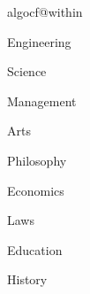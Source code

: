 \renewcommand{\algorithmcfname}{\hei 算法}
\setlength\AlCapSkip{1.2ex}
\SetAlgoSkip{1pt}
\renewcommand{\algocf@captiontext}[2]{\hei \wuhao#1\algocf@typo ~ \AlCapFnt{}#2} %
\expandafter\ifx\csname algocf@within\endcsname\relax%
\renewcommand\thealgocf{\@arabic\c@algocf} %
\else%
\renewcommand\thealgocf{\csname the\algocf@within\endcsname-\@arabic\c@algocf}
\fi
\renewcommand{\algocf@makecaption}[2]{%
  \addtolength{\hsize}{\algomargin}%
  \sbox\@tempboxa{\algocf@captiontext{#1}{#2}}%
    \hskip .5\algomargin%
    \parbox[t]{\hsize}{\centering\algocf@captiontext{#1}{#2}}%
  \addtolength{\hsize}{-\algomargin}%
}
\newcommand{\AlgoBiCaption}[2]{%
   \caption[#1]{\protect\setlength{\baselineskip}{1.5em}#1 \protect \\ Algo. \thealgocf~~ #2} %
   \addcontentsline{aen}{algoen}{\protect\numberline{\thealgoen}{#2}}
   }

\makeatother

\def \xuekeEngineering {Engineering}
\def \xuekeScience {Science}
\def \xuekeManagement {Management}
\def \xuekeArts {Arts}
\def \xuekePhilosophy {Philosophy}
\def \xuekeEconomics {Economics}
\def \xuekeLaws {Laws}
\def \xuekeEducation {Education}
\def \xuekeHistory {History}


\ifx \xueke \xuekeEngineering
\newcommand{\cxueke}{工学}
\newcommand{\exueke}{Engineering}
\fi

\ifx \xueke \xuekeScience
\newcommand{\cxueke}{理学}
\newcommand{\exueke}{Science}
\fi

\ifx \xueke \xuekeManagement
\newcommand{\cxueke}{管理学}
\newcommand{\exueke}{Management}
\fi

\ifx \xueke \xuekeArts
\newcommand{\cxueke}{文学}
\newcommand{\exueke}{Arts}
\fi

\ifx \xueke \xuekePhilosophy
\newcommand{\cxueke}{哲学}
\newcommand{\exueke}{Philosophy}
\fi

\ifx \xueke \xuekeEconomics
\newcommand{\cxueke}{经济学}
\newcommand{\exueke}{Economics}
\fi

\ifx \xueke \xuekeLaws
\newcommand{\cxueke}{法学}
\newcommand{\exueke}{Laws}
\fi

\ifx \xueke \xuekeEducation
\newcommand{\cxueke}{教育学}
\newcommand{\exueke}{Education}
\fi

\ifx \xueke \xuekeHistory
\newcommand{\cxueke}{历史学}
\newcommand{\exueke}{History}
\fi


\newcommand{\VB}[1]{\textcolor{red}{\bf #1}}
\newcommand{\VS}[1]{\textcolor{blue}{\bf #1}}
\newcommand{\VT}[1]{\textcolor{green}{\bf #1}}




\renewcommand{\algorithmicrequire}{\textbf{Input:}}
\renewcommand{\algorithmicensure}{\textbf{Output:}}

